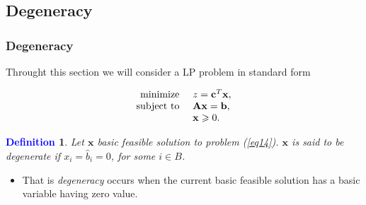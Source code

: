 \documentclass{beamer}
\theoremstyle{plain}
\newcommand{\git}[1]{\textcolor{grena}{\it #1}}
\newtheorem{deff}{\bf \textcolor{blue}{Definition}}[subsection]
\let\ge\geqslant
\def\x{{\mathrm x}}
\def\AA{{\bf \mathrm\bf A}}
\def\bb{{\bf \mathrm \bf b}}
\def\cc{{\bf \mathrm \bf c}}
\def\x{{\mathbf x}}
\begin{document}
\subsection{Degeneracy}
\begin{frame}\frametitle{Degeneracy}
\justifying

Throught this section we will consider a LP problem in standard form
\begin{mdframed}[style=myf]
\begin{equation}
\label{eq14}
 \begin{array}{rl}
\textrm{minimize } & z = \cc^T\x, \\
\textrm{subject to } & \AA\x = \bb,\\
& \x \ge 0.
\end{array}
\end{equation}
\end{mdframed}

\begin{mdframed}[style=myf]
\begin{deff}
\justifying
Let $ \x $ basic feasible solution to problem (\ref{eq14}). $ \x $ is said to be \git{degenerate} if $ x_i = \widehat{b}_i = 0 $, for some $ i \in B $.
\end{deff}
\end{mdframed}

\begin{itemize}
\justifying

\item That is \git{degeneracy} occurs when the current basic feasible solution has a basic variable having zero value.

\end{itemize}

\end{frame}
\end{document}
